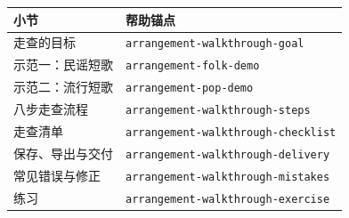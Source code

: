 \begin{helpmapping}
\begin{longtable}{p{}p{}}
\toprule
小节 & 帮助锚点 \\
\midrule
走查的目标 & \texttt{arrangement-walkthrough-goal} \\
示范一：民谣短歌 & \texttt{arrangement-folk-demo} \\
示范二：流行短歌 & \texttt{arrangement-pop-demo} \\
八步走查流程 & \texttt{arrangement-walkthrough-steps} \\
走查清单 & \texttt{arrangement-walkthrough-checklist} \\
保存、导出与交付 & \texttt{arrangement-walkthrough-delivery} \\
常见错误与修正 & \texttt{arrangement-walkthrough-mistakes} \\
练习 & \texttt{arrangement-walkthrough-exercise} \\
\bottomrule
\end{longtable}
\end{helpmapping}
